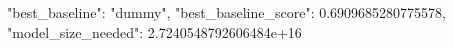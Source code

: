 {
  "best_baseline": "dummy",
  "best_baseline_score": 0.6909685280775578,
  "model_size_needed": 2.7240548792606484e+16
}